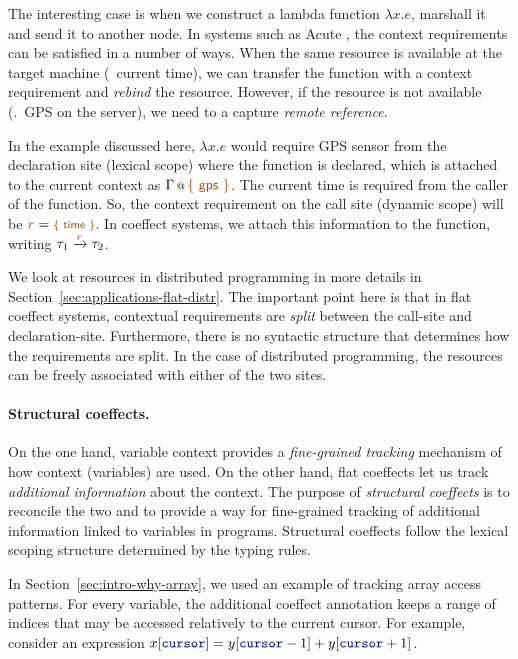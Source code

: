 The interesting case is when we construct a lambda function $\lambda x.e$, marshall it and
send it to another node. In systems such as Acute \cite{app-distributed-acute}, the context 
requirements can be satisfied in a number of ways. When the same resource is available at the target
machine (\eg~current time), we can transfer the function with a context requirement and \emph{rebind} 
the resource. However, if the resource is not available (\eg.~GPS on the server), we need to a 
capture \emph{remote reference}.

In the example discussed here, $\lambda x.e$ would require GPS sensor from the declaration
site (lexical scope) where the function is declared, which is attached to the current context
as $\coctx{\Gamma}{ \aclrd{\ident{\{ gps \}}} }$. The current time is required from the caller
of the function. So, the context requirement on the call site (dynamic scope) will be
$\aclrd{r}=\aclrd{\footnotesize\ident{\{ time \}}}$. In coeffect systems, we attach this information
to the function, writing $\tau_1 \xrightarrow{ \aclrd{r} } \tau_2$.

We look at resources in distributed programming in more details in Section~\ref{sec:applications-flat-distr}.
The important point here is that in flat coeffect systems, contextual requirements are 
\emph{split} between the call-site and declaration-site. Furthermore, there is no syntactic
structure that determines how the requirements are split. In the case of distributed
programming, the resources can be freely associated with either of the two sites.

\paragraph{Structural coeffects.}
On the one hand, variable context provides a \emph{fine-grained tracking} mechanism of how context
(variables) are used. On the other hand, flat coeffects let us track \emph{additional information} about 
the context. The purpose of \emph{structural coeffects} is to reconcile the two and to provide a way
for fine-grained tracking of additional information linked to variables in programs. Structural 
coeffects follow the lexical scoping structure determined by the typing rules.

In Section~\ref{sec:intro-why-array}, we used an example of tracking array access patterns. For every
variable, the additional coeffect annotation keeps a range of indices that may be accessed relatively
to the current cursor. For example, consider an expression 
$x[\kvd{cursor}] = y[\kvd{cursor}-1] + y[\kvd{cursor}+1]$.

